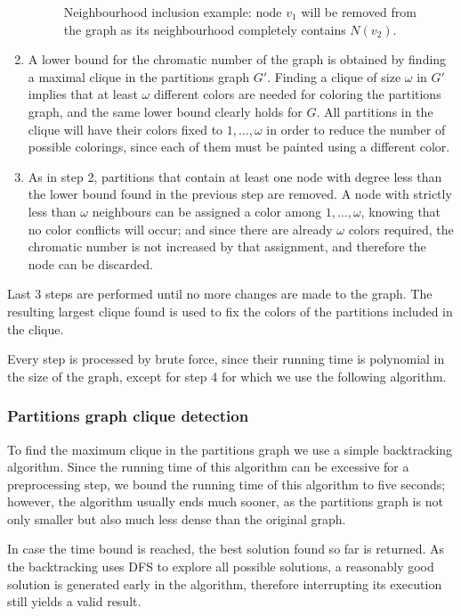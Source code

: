\begin{enumerate}
\begin{figure}[h]
\begin{tikzpicture}
	\end{tikzpicture} 
\caption{Neighbourhood inclusion example: node $v_1$ will be removed from the graph as its neighbourhood completely contains $N(v_2)$.}
\end{figure}
	
	\item{A lower bound for the chromatic number of the graph is obtained by finding a maximal clique in the partitions graph $G'$. Finding a clique of size $\omega$ in $G'$ implies that at least $\omega$ different colors are needed for coloring the partitions graph, and the same lower bound clearly holds for $G$. All partitions in the clique will have their colors fixed to $1,\ldots,\omega$ in order to reduce the number of possible colorings, since each of them must be painted using a different color.}
	\item{As in step 2, partitions that contain at least one node with degree less than the lower bound found in the previous step are removed. A node with strictly less than $\omega$ neighbours can be assigned a color among $1,\ldots,\omega$, knowing that no color conflicts will occur; and since there are already $\omega$ colors required, the chromatic number is not increased by that assignment, and therefore the node can be discarded.}
\end{enumerate}

Last 3 steps are performed until no more changes are made to the graph. The resulting largest clique found is used to fix the colors of the partitions included in the clique. 

Every step is processed by brute force, since their running time is polynomial in the size of the graph, except for step 4 for which we use the following algorithm.

\subsubsection*{Partitions graph clique detection}

To find the maximum clique in the partitions graph we use a simple backtracking algorithm. Since the running time of this algorithm can be excessive for a preprocessing step, we bound the running time of this algorithm to five seconds; however, the algorithm usually ends much sooner, as the partitions graph is not only smaller but also much less dense than the original graph. 

In case the time bound is reached, the best solution found so far is returned. As the backtracking uses DFS to explore all possible solutions, a reasonably good solution is generated early in the algorithm, therefore interrupting its execution still yields a valid result.

